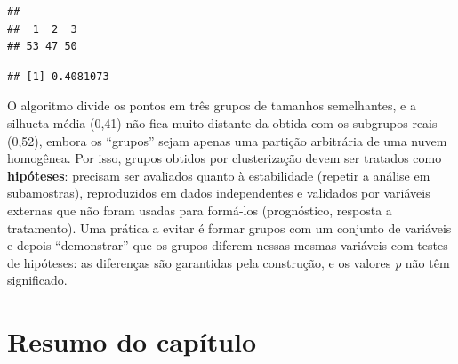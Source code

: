 \documentclass[
]{book}
\newenvironment{Shaded}{\begin{snugshade}}{\end{snugshade}}
\newcommand{\AttributeTok}[1]{\textcolor[rgb]{0.13,0.29,0.53}{#1}}
\newcommand{\DecValTok}[1]{\textcolor[rgb]{0.00,0.00,0.81}{#1}}
\newcommand{\FunctionTok}[1]{\textcolor[rgb]{0.13,0.29,0.53}{\textbf{#1}}}
\newcommand{\NormalTok}[1]{#1}
\newcommand{\OtherTok}[1]{\textcolor[rgb]{0.56,0.35,0.01}{#1}}
\newcommand{\SpecialCharTok}[1]{\textcolor[rgb]{0.81,0.36,0.00}{\textbf{#1}}}
\newcommand{\StringTok}[1]{\textcolor[rgb]{0.31,0.60,0.02}{#1}}
\begin{document}
\begin{Shaded}
\end{Shaded}

\begin{verbatim}
## 
##  1  2  3 
## 53 47 50
\end{verbatim}

\begin{Shaded}
\end{Shaded}

\begin{verbatim}
## [1] 0.4081073
\end{verbatim}

O algoritmo divide os pontos em três grupos de tamanhos semelhantes, e a silhueta média (0,41) não fica muito distante da obtida com os subgrupos reais (0,52), embora os ``grupos'' sejam apenas uma partição arbitrária de uma nuvem homogênea. Por isso, grupos obtidos por clusterização devem ser tratados como \textbf{hipóteses}: precisam ser avaliados quanto à estabilidade (repetir a análise em subamostras), reproduzidos em dados independentes e validados por variáveis externas que não foram usadas para formá-los (prognóstico, resposta a tratamento). Uma prática a evitar é formar grupos com um conjunto de variáveis e depois ``demonstrar'' que os grupos diferem nessas mesmas variáveis com testes de hipóteses: as diferenças são garantidas pela construção, e os valores \emph{p} não têm significado.

\section{Resumo do capítulo}\label{resumo-do-capuxedtulo-5}
\end{document}
